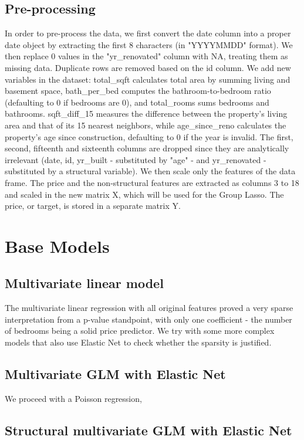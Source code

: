\documentclass[a4paper, 8pt]{article}
\begin{document}
\begin{multicols}{2}
\subsection{Pre-processing}
In order to pre-process the data, we first convert the date column into a proper date object by extracting the first 8 characters (in "YYYYMMDD" format). We then replace 0 values in the "yr{\_}renovated" column with NA, treating them as missing data. Duplicate rows are removed based on the id column.
We add new variables in the dataset: total{\_}sqft calculates total area by summing living and basement space, bath{\_}per{\_}bed computes the bathroom-to-bedroom ratio (defaulting to 0 if bedrooms are 0), and total{\_}rooms sums bedrooms and bathrooms. sqft{\_}diff{\_}15 measures the difference between the property’s living area and that of its 15 nearest neighbors, while age{\_}since{\_}reno calculates the property’s age since construction, defaulting to 0 if the year is invalid.
The first, second, fifteenth and sixteenth columns are dropped since they are analytically irrelevant (date, id, yr{\_}built - substituted by "age" - and yr{\_}renovated - substituted by a structural variable). We then scale only the features of the data frame.
The price and the non-structural features are extracted as columns 3 to 18 and scaled in the new matrix X, which will be used for the Group Lasso. The price, or target, is stored in a separate matrix Y.


\section{Base Models}
\subsection{Multivariate linear model}
The multivariate linear regression with all original features proved a very sparse interpretation from a p-value standpoint, with only one coefficient - the number of bedrooms being a solid price predictor. We try with some more complex models that also use Elastic Net to check whether the sparsity is justified.


\subsection{Multivariate GLM with Elastic Net}
We proceed with a Poisson regression, 


\subsection{Structural multivariate GLM with Elastic Net}



\end{multicols}
\end{document}
